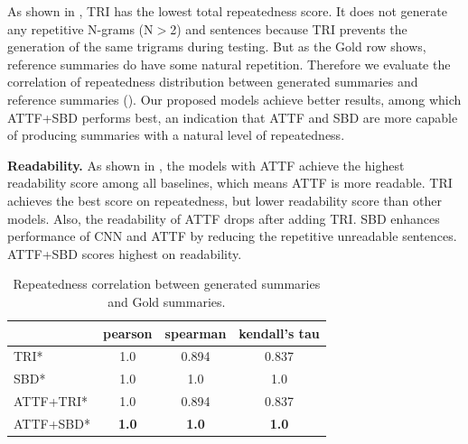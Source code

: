 As shown in , TRI has the lowest total repeatedness score.
It does not generate any repetitive N-grams (N$>$2) and sentences 
because TRI prevents the generation of the same trigrams during testing.
But as the Gold row shows, reference summaries do have some natural repetition.
Therefore we evaluate the correlation of repeatedness distribution between
generated summaries and reference summaries ().
Our proposed models achieve better results, among which ATTF+SBD performs best, an indication that ATTF and SBD are more capable of producing summaries with a natural level of repeatedness.
	
\textbf{Readability.}
As shown in , 
the models with ATTF achieve the
highest readability score among all baselines, 
which means ATTF is more readable.
TRI achieves the best score on repeatedness, 
but lower readability score than other models.
Also, the readability of ATTF drops after adding TRI.
SBD enhances performance of CNN and ATTF by reducing the repetitive unreadable sentences. 
ATTF+SBD scores highest on readability.

\begin{table}[th!]
	\centering
	\small
	\begin{tabular}{|l|c|c|c|}
		\hline
		     & pearson  & spearman & kendall's tau \\
		\hline
		TRI* & 1.0 & 0.894 & 0.837  \\
		SBD* & 1.0 & 1.0 & 1.0 \\
		ATTF+TRI* & 1.0 & 0.894 & 0.837 \\
		ATTF+SBD* & \bf 1.0 & \bf 1.0 & \bf 1.0 \\
		\hline
	\end{tabular}
    \caption{Repeatedness correlation between generated summaries and Gold summaries.}
	\label{tab:eval_repcor}
\end{table}

